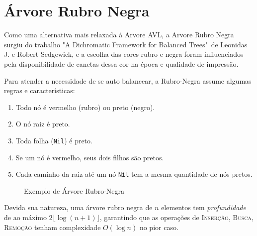 \section{Árvore Rubro Negra}
\label{sec:rubro}

Como uma alternativa mais relaxada à Arvore AVL, a Arvore Rubro Negra surgiu do trabalho "A Dichromatic Framework for Balanced Trees"\ de Leonidas J. e Robert Sedgewick, e a escolha das cores rubro e negra foram influenciados pela disponibilidade de canetas dessa cor na época e qualidade de impressão.

Para atender a necessidade de se auto balancear, a Rubro-Negra assume algumas regras e características:

\begin{enumerate}
	\item Todo nó é vermelho (rubro) ou preto (negro).
	\item O nó raiz é preto.
	\item Toda folha (\texttt{Nil}) é preto.
	\item Se um nó é vermelho, seus dois filhos são pretos.
	\item Cada caminho da raiz até um nó \texttt{Nil} tem a mesma quantidade de nós pretos.
\end{enumerate}

\begin{figure}[!ht]
	\centering
	\caption{Exemplo de Árvore Rubro-Negra}
	\label{fig:rubro_example}
\end{figure}
\FloatBarrier


Devida sua natureza, uma árvore rubro negra de $n$ elementos tem \textit{profundidade} de ao máximo $2\lfloor\log (n + 1)\rfloor$, garantindo que as operações de \textrm{I\textsc{nserção}}, \textrm{B\textsc{usca}}, \textrm{R\textsc{emoção}} tenham complexidade $O(\log n)$ no pior caso.


